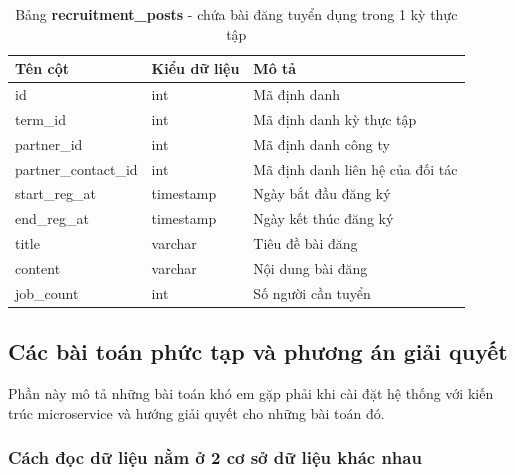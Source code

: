 \documentclass[./../main.tex]{subfiles}
\begin{document}
\begin{table}[H]
	\caption[Bảng recruitment\_posts]{Bảng \textbf{recruitment\_posts} - chứa bài đăng tuyển dụng trong 1 kỳ thực tập}
	\label{tab:db_posts}
	\begin{tabular}{|l|l|l|}
	\hline
	\textbf{Tên cột}     & \textbf{Kiểu dữ liệu} & \textbf{Mô tả}                   \\ \hline
	id                   & int                   & Mã định danh                     \\ \hline
	term\_id             & int                   & Mã định danh kỳ thực tập         \\ \hline
	partner\_id          & int                   & Mã định danh công ty             \\ \hline
	partner\_contact\_id & int                   & Mã định danh liên hệ của đối tác \\ \hline
	start\_reg\_at       & timestamp             & Ngày bắt đầu đăng ký             \\ \hline
	end\_reg\_at         & timestamp             & Ngày kết thúc đăng ký            \\ \hline
	title                & varchar               & Tiêu đề bài đăng                 \\ \hline
	content              & varchar               & Nội dung bài đăng                \\ \hline
	job\_count           & int                   & Số người cần tuyển               \\ \hline
	\end{tabular}
\end{table}

\subsection{Các bài toán phức tạp và phương án giải quyết}

Phần này mô tả những bài toán khó em gặp phải khi cài đặt hệ thống với
kiến trúc microservice và hướng giải quyết cho những bài toán đó.

\hypertarget{cuxe1ch-ux111ux1ecdc-dux1eef-liux1ec7u-nux1eb1m-ux1edf-2-cux1a1-sux1edf-dux1eef-liux1ec7u-khuxe1c-nhau}{%
\subsubsection{Cách đọc dữ liệu nằm ở 2 cơ sở dữ liệu khác
nhau}\label{cuxe1ch-ux111ux1ecdc-dux1eef-liux1ec7u-nux1eb1m-ux1edf-2-cux1a1-sux1edf-dux1eef-liux1ec7u-khuxe1c-nhau}}
\end{document}
